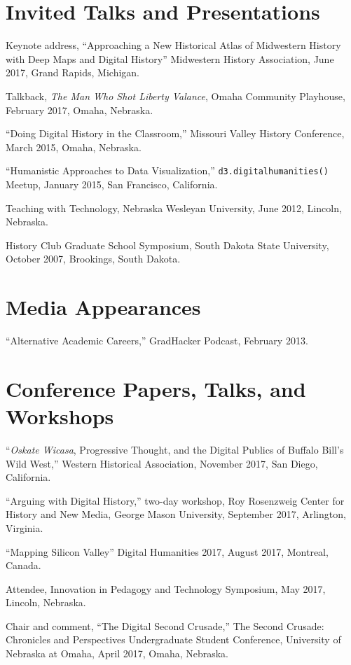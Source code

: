 \section{Invited Talks and
Presentations}\label{invited-talks-and-presentations}

Keynote address, ``Approaching a New Historical Atlas of Midwestern
History with Deep Maps and Digital History'' Midwestern History
Association, June 2017, Grand Rapids, Michigan.

Talkback, \emph{The Man Who Shot Liberty Valance}, Omaha Community
Playhouse, February 2017, Omaha, Nebraska.

``Doing Digital History in the Classroom,'' Missouri Valley History
Conference, March 2015, Omaha, Nebraska.

``Humanistic Approaches to Data Visualization,''
\texttt{d3.digitalhumanities()} Meetup, January 2015, San Francisco,
California.

Teaching with Technology, Nebraska Wesleyan University, June 2012,
Lincoln, Nebraska.

History Club Graduate School Symposium, South Dakota State University,
October 2007, Brookings, South Dakota.

\section{Media Appearances}\label{media-appearances}

``Alternative Academic Careers,'' GradHacker Podcast, February 2013.

\section{Conference Papers, Talks, and
Workshops}\label{conference-papers-talks-and-workshops}

``\emph{Oskate Wicasa}, Progressive Thought, and the Digital Publics of
Buffalo Bill's Wild West,'' Western Historical Association, November
2017, San Diego, California.

``Arguing with Digital History,'' two-day workshop, Roy Rosenzweig
Center for History and New Media, George Mason University, September
2017, Arlington, Virginia.

``Mapping Silicon Valley'' Digital Humanities 2017, August 2017,
Montreal, Canada.

Attendee, Innovation in Pedagogy and Technology Symposium, May 2017,
Lincoln, Nebraska.

Chair and comment, ``The Digital Second Crusade,'' The Second Crusade:
Chronicles and Perspectives Undergraduate Student Conference, University
of Nebraska at Omaha, April 2017, Omaha, Nebraska.

